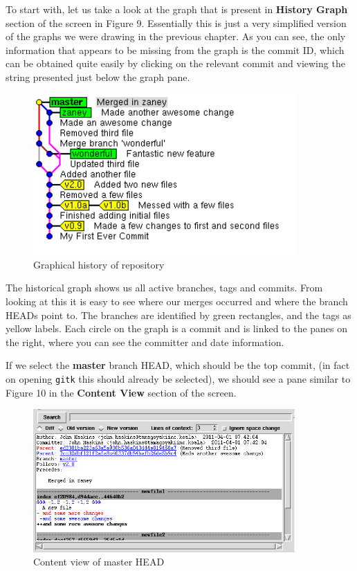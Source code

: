 To start with, let us take a look at the graph that is present in \textbf{History Graph} section of the screen in Figure 9.  Essentially this is just a very simplified version of the graphs we were drawing in the previous chapter.  As you can see, the only information that appears to be missing from the graph is the commit ID, which can be obtained quite easily by clicking on the relevant commit and viewing the string presented just below the graph pane.

\begin{figure}[hbt]
\centering
\includegraphics[width=10cm]{images/f-w5-d9.png}
\caption{Graphical history of repository}
\end{figure} 

The historical graph shows us all active branches, tags and commits.  From looking at this it is easy to see where our merges occurred and where the branch HEADs point to.  The branches are identified by green rectangles, and the tags as yellow labels.  Each circle on the graph is a commit and is linked to the panes on the right, where you can see the committer and date information.

If we select the \textbf{master} branch HEAD, which should be the top commit, (in fact on opening \texttt{gitk} this should already be selected), we should see a pane similar to Figure 10 in the \textbf{Content View} section of the screen.

\begin{figure}[hbt]
\centering
\includegraphics[width=10cm]{images/f-w5-d10.png}
\caption{Content view of master HEAD}
\end{figure} 

